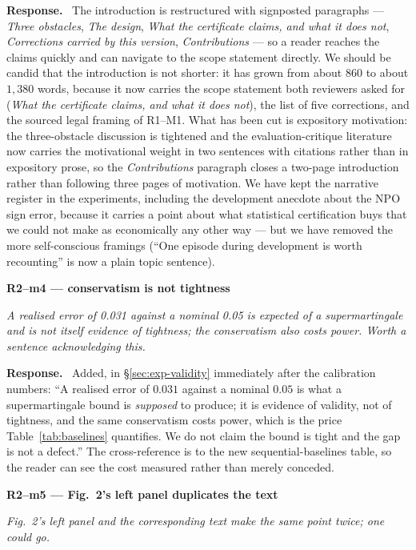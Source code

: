 \documentclass[11pt,a4paper]{article}
\newenvironment{point}[1]{%
  \par\medskip\noindent\textbf{\color{rcol}#1}\par\nopagebreak\smallskip\begingroup
  \color{rcol}\itshape}{\endgroup\par}
\newenvironment{reply}{%
  \par\smallskip\noindent\textbf{\color{acol}Response.}\ \begingroup}{\endgroup\par}
\begin{document}
\begin{reply}
The introduction is restructured with signposted paragraphs --- \emph{Three obstacles},
\emph{The design}, \emph{What the certificate claims, and what it does not},
\emph{Corrections carried by this version}, \emph{Contributions} --- so a reader reaches
the claims quickly and can navigate to the scope statement directly. We should be
candid that the introduction is not shorter: it has grown from about $860$ to about
$1{,}380$ words, because it now carries the scope statement both reviewers asked for
(\emph{What the certificate claims, and what it does not}), the list of five
corrections, and the sourced legal framing of R1--M1. What has been cut is expository
motivation: the three-obstacle discussion is tightened and the evaluation-critique
literature now carries the motivational weight in two sentences with citations rather
than in expository prose, so the \emph{Contributions} paragraph closes a two-page
introduction rather than following three pages of motivation. We have kept the narrative register in the
experiments, including the development anecdote about the NPO sign error, because it
carries a point about what statistical certification buys that we could not make as
economically any other way --- but we have removed the more self-conscious framings
(``One episode during development is worth recounting'' is now a plain topic sentence).
\end{reply}

\begin{point}{R2--m4 --- conservatism is not tightness}
A realised error of 0.031 against a nominal 0.05 is expected of a supermartingale and is
not itself evidence of tightness; the conservatism also costs power. Worth a sentence
acknowledging this.
\end{point}

\begin{reply}
Added, in \S\ref{sec:exp-validity} immediately after the calibration numbers: ``A realised error of
$0.031$ against a nominal $0.05$ is what a supermartingale bound is \emph{supposed} to
produce; it is evidence of validity, not of tightness, and the same conservatism costs
power, which is the price Table~\ref{tab:baselines} quantifies. We do not claim the bound is tight and the
gap is not a defect.'' The cross-reference is to the new sequential-baselines table, so
the reader can see the cost measured rather than merely conceded.
\end{reply}

\begin{point}{R2--m5 --- Fig.\ 2's left panel duplicates the text}
Fig.\ 2's left panel and the corresponding text make the same point twice; one could go.
\end{point}
\end{document}
